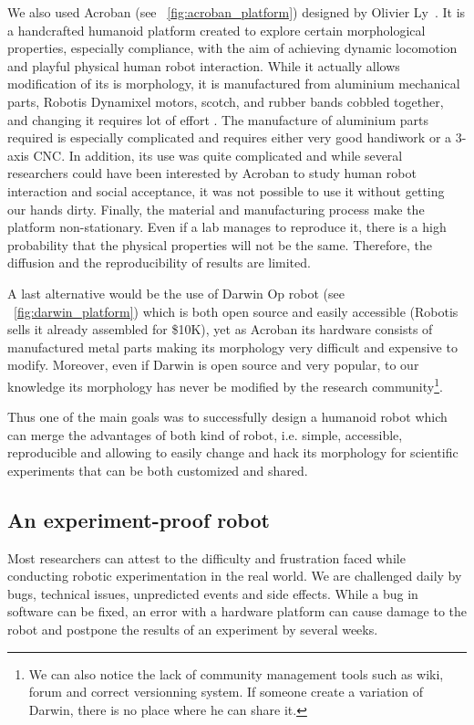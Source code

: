 We also used Acroban (see \figurename~\ref{fig:acroban_platform}) designed by Olivier Ly~\parencite{Ly2010}. It is a handcrafted humanoid platform created to explore certain morphological properties, especially compliance, with the aim of achieving dynamic locomotion and playful physical human robot interaction.
While it actually allows modification of its is morphology, it is manufactured from aluminium mechanical parts, Robotis Dynamixel motors, scotch, and rubber bands cobbled together, and changing it requires lot of effort . The manufacture of aluminium parts required is especially complicated and requires either very good handiwork or a 3-axis CNC.
In addition, its use was quite complicated and while several researchers could have been interested by Acroban to study human robot interaction and social acceptance, it was not possible to use it without getting our hands dirty.
Finally, the material and manufacturing process make the platform non-stationary. Even if a lab manages to reproduce it, there is a high probability that the physical properties will not be the same. Therefore, the diffusion and the reproducibility of results are limited.


A last alternative would be the use of Darwin Op robot (see \figurename~\ref{fig:darwin_platform}) which is both open source and easily accessible (Robotis sells it already assembled for \$10K), yet as Acroban its hardware consists of manufactured metal parts making its morphology very difficult and expensive to modify. Moreover, even if Darwin is open source and very popular, to our knowledge its morphology has never be modified by the research community\footnote{We can also notice the lack of community management tools such as wiki, forum and correct versionning system. If someone create a variation of Darwin, there is no place where he can share it.}.

Thus one of the main goals was to successfully design a humanoid robot which can merge the advantages of both kind of robot, i.e. simple, accessible, reproducible and allowing to easily change and hack its morphology for scientific experiments that can be both customized and shared.

\subsection{An experiment-proof robot} %

Most researchers can attest to the difficulty and frustration faced while conducting robotic experimentation in the real world. We are challenged daily by bugs, technical issues, unpredicted events and side effects. While a bug in software can be fixed, an error with a hardware platform can cause damage to the robot and postpone the results of an experiment by several weeks.

